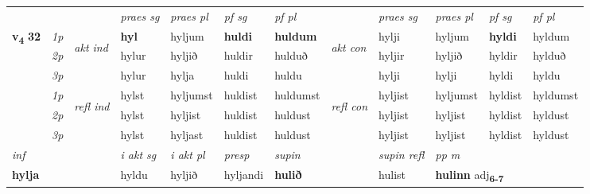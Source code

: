 \begin{longtable}[l]{X>{\footnotesize\itshape}llXXXXlXXXX}
 & &   & \textit{praes sg}  & \textit{praes pl}    & \textit{ pf sg} & \textit{pf pl} & & \textit{praes sg}  & \textit{praes pl}    & \textit{pf sg} & \textit{pf pl }  \\ \cmidrule{4-7} \cmidrule{9-12}
 \multirow{2}{*}{{{\textbf{v{\textsubscript{4}}} \Large{\textbf{32}}}}}  & 1p & \multirow{3}{*}{\begin{turn}{90}\textit{akt ind}\end{turn}} & \textbf{hyl} & hyljum & \textbf{huldi} & \textbf{huldum} & \multirow{3}{*}{\begin{turn}{90}\textit{akt con}\end{turn}} &hylji & hyljum & \textbf{hyldi} & hyldum\\*
 & 2p &  &  hylur  & hyljið & huldir & hulduð & & hyljir & hyljið & hyldir & hylduð \\*
 & 3p &  & hylur & hylja & huldi & huldu & & hylji & hylji& hyldi & hyldu \\*
\cmidrule{4-7} \cmidrule{9-12}
 & 1p & \multirow{3}{*}{\begin{turn}{90}\textit{refl ind}\end{turn}}  & hylst & hyljumst & huldist & huldumst & \multirow{3}{*}{\begin{turn}{90}\textit{refl con}\end{turn}}  &hyljist & hyljumst & hyldist & hyldumst \\*
 & 2p &  & hylst & hyljist & huldist & huldust & &hyljist & hyljist & hyldist & hyldust \\*
 & 3p  & & hylst & hyljast & huldist & huldust & & hyljist & hyljist& hyldist & hyldust \\*
\cmidrule{4-7} \cmidrule{9-12}

   {\textit{inf}} & &  & \textit{i akt sg} & \textit{i akt pl}   & \textit{presp} & \textit{supin} && \textit{supin refl} & \textit{pp m} \\*
  {\textbf{hylja}} & && hyldu  & hyljið   & hyljandi &  \textbf{hulið} && hulist & \multicolumn{2}{l}{\textbf{hulinn} adj\textbf{\textsubscript{6-7}}} \\*

\midrule


\end{longtable}
